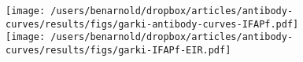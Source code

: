 \documentclass[11pt]{article}
\title{}
\author{}
\date{}
\begin{document}


\renewcommand{\figurename}{Fig.}


\begin{figure}[htbp]
\texttt{[image: /users/benarnold/dropbox/articles/antibody-curves/results/figs/garki-antibody-curves-IFAPf.pdf]} \\
\hspace*{\fill} \texttt{[image: /users/benarnold/dropbox/articles/antibody-curves/results/figs/garki-IFAPf-EIR.pdf]} 


\end{figure}
\end{document}
